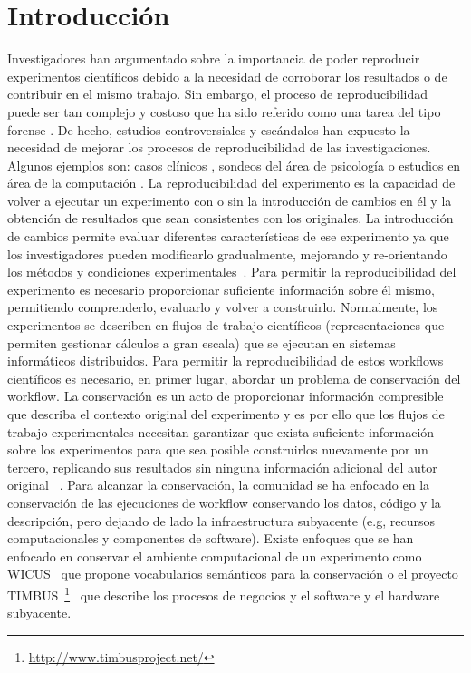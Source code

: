 \chapter{Introducción}
\label{Chapter1} 
\newcommand{\keyword}[1]{\textbf{#1}}
\newcommand{\tabhead}[1]{\textbf{#1}}
\newcommand{\code}[1]{\texttt{#1}}
\newcommand{\file}[1]{\texttt{\bfseries#1}}
\newcommand{\option}[1]{\texttt{\itshape#1}}
Investigadores han argumentado sobre la importancia de poder reproducir experimentos científicos debido a la necesidad de corroborar los resultados o de contribuir en el mismo trabajo. 
Sin embargo, el proceso de reproducibilidad puede ser tan complejo y costoso que ha sido referido como una tarea del tipo forense \cite{baggerly2009deriving}.
De hecho, estudios controversiales y escándalos han expuesto la necesidad de mejorar los procesos de reproducibilidad de las investigaciones. Algunos ejemplos son: casos clínicos \cite{ioannidis2009repeatability}, sondeos del área de psicología \cite{open2015estimating} o estudios en área de la computación \cite{baggerly2009deriving}.
La reproducibilidad del experimento es la capacidad de volver a ejecutar un experimento con o sin la introducción de cambios en él y la obtención de resultados que sean consistentes con los originales.
La introducción de cambios permite evaluar diferentes características de ese experimento ya que los investigadores pueden modificarlo gradualmente, mejorando y re-orientando los métodos y condiciones experimentales~\cite{stodden2010reproducible}.
Para permitir la reproducibilidad del experimento es necesario proporcionar suficiente información sobre él mismo, permitiendo comprenderlo, evaluarlo y volver a construirlo. Normalmente, los experimentos se describen en flujos de trabajo científicos (representaciones que permiten gestionar cálculos a gran escala) que se ejecutan en sistemas informáticos distribuidos.
Para permitir la reproducibilidad de estos workflows científicos es necesario, en primer lugar, abordar un problema de conservación del workflow.
La conservación es un acto de proporcionar información compresible que describa el contexto original del experimento y es por ello que los flujos de trabajo experimentales necesitan garantizar que exista suficiente información sobre los experimentos para que sea posible construirlos nuevamente por un tercero, replicando sus resultados sin ninguna información adicional del autor original ~\cite{garijo2013quantifying}.
Para alcanzar la conservación, la comunidad se ha enfocado en la conservación de las ejecuciones de workflow conservando los datos, código y la descripción, pero dejando de lado la infraestructura subyacente (e.g, recursos computacionales y componentes de software).
Existe enfoques que se han enfocado en conservar el ambiente computacional de un experimento como WICUS~\cite{santana2017reproducibility} que propone vocabularios semánticos para la conservación o el proyecto TIMBUS~\footnote{\url{http://www.timbusproject.net/}}~\cite{dappert2013describing} que describe los procesos de negocios y el software y el hardware subyacente.


